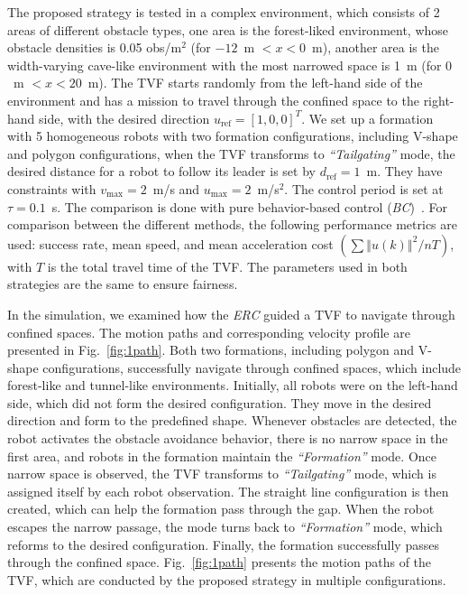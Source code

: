 The proposed strategy is tested in a complex environment, which consists of 2 areas of different obstacle types, one area is the forest-liked environment, whose obstacle densities is 0.05 obs/m$^2$ (for $-12$~m $<x<0$~m), another area is the width-varying cave-like environment with the most narrowed space is 1~m (for $0$~m $<x<20$~m). The TVF starts randomly from the left-hand side of the environment and has a mission to travel through the confined space to the right-hand side, with the desired direction $u_\text{ref}=\left[1,0,0\right]^T$. We set up a formation with 5 homogeneous robots with two formation configurations, including V-shape and polygon configurations, when the TVF transforms to \textit{``Tailgating''} mode, the desired distance for a robot to follow its leader is set by $d_\text{ref}=1$~m. They have constraints with $v_\text{max}=2$~m/s and $u_\text{max}=2$~m/s$^2$. The control period is set at $\tau=0.1$~s. The comparison is done with pure behavior-based control (\textit{BC})~\cite{736776,Vsrhelyi2018}. For comparison between the different methods, the following performance metrics are used: success rate, mean speed, and mean acceleration cost $(\sum{\left\Vert u(k)\right\Vert^2}/{nT})$, with $T$ is the total travel time of the TVF. The parameters used in both strategies are the same to ensure fairness.

In the simulation, we examined how the \textit{ERC} guided a TVF to navigate through confined spaces. The motion paths and corresponding velocity profile are presented in Fig.~\ref{fig:1path}. Both two formations, including polygon and V-shape configurations, successfully navigate through confined spaces, which include forest-like and tunnel-like environments. Initially, all robots were on the left-hand side, which did not form the desired configuration. They move in the desired direction and form to the predefined shape. Whenever obstacles are detected, the robot activates the obstacle avoidance behavior, there is no narrow space in the first area, and robots in the formation maintain the \textit{``Formation''} mode. Once narrow space is observed, the TVF transforms to \textit{``Tailgating''} mode, which is assigned itself by each robot observation. The straight line configuration is then created, which can help the formation pass through the gap. When the robot escapes the narrow passage, the mode turns back to \textit{``Formation''} mode, which reforms to the desired configuration. Finally, the formation successfully passes through the confined space. Fig.~\ref{fig:1path} presents the motion paths of the TVF, which are conducted by the proposed strategy in multiple configurations.

